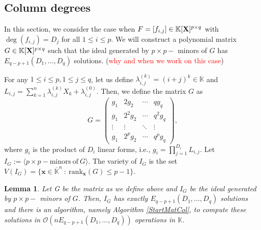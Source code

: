 \documentclass[11pt]{article}
\numberwithin{Property}{section}
\numberwithin{Theorem}{section}
\numberwithin{Proposition}{section}
\newtheorem{Lemma}{Lemma}%
\numberwithin{Lemma}{section}
\numberwithin{Corollary}{section}
\numberwithin{Definition}{section}
\numberwithin{Remark}{section}
\numberwithin{Conjecture}{section}
\numberwithin{Problem}{section}
\numberwithin{Example}{section}
\numberwithin{Claim}{section}
\renewcommand{\leq}{\leqslant}
\def\bar{\overline}
\newcommand{\bigO}[1]{\mathcal{O}(#1)} %
\newcommand{\field}{\mathbb{K}} %
\newcommand{\mat}[1]{\mathbf{\MakeUppercase{#1}}} %
\newcommand{\todo}[1]{\textcolor{red}{#1}} %
\begin{document}
\subsection{Column degrees}
\label{subsec:cd}
In this section, we consider the case when $F = [f_{i,j}] \in \field[\mat{X}]^{p\times q}$ with $\deg({f_{i,j}}) = D_j$ for all $1 \leq i \leq p$. We will construct a polynomial matrix $G \in \field[\mat{X}]^{p \times q}$ such that the ideal generated by $p \times p-$ minors of $G$ has $E_{q-p+1}(D_1, \ldots, D_q)$ solutions.
(\todo{why and when we work on this case})

For any $1 \leq i \leq p, 1 \leq j \leq q$, let us define $\lambda_{i,j}^{(k)}  = (i+j)^k \in \field$ and $L_{i,j} = \sum_{k = 1}^{n}\lambda_{i,j}^{(k)}X_k + \lambda_{i,j}^{(0)}$. Then, we define the matrix $G$ as
\[G = 
\left( \begin{matrix}
g_1 & 2g_2 & \cdots & qg_{q}\\
g_1 & 2^2g_2 & \cdots & q^2g_q\\
\vdots & \vdots & \ddots & \vdots \\
g_1 & 2^pg_2 & \cdots & q^pg_q
\end{matrix} \right),
\]
where $g_{i}$ is the product of $D_i$ linear forms, i.e., $g_i = \prod_{j = 1}^{D_i}L_{i,j}$. Let $I_G := \langle p \times p - \mathrm{minors \ of \ } G \rangle$. The variety of $I_G$ is the set $V(I_G) = \{\mathbf{x} \in \bar{\field}^n \ : \ \mathrm{rank}_{\mathbf{x}}(G) \leq p-1\}$. %
\begin{Lemma} \label{G} Let G be the matrix as we define above and $I_G$ be the ideal generated by $p \times p-$ minors of $G$. Then, $I_G$ has exactly $E_{q-p+1}(D_1, \ldots, D_q)$ solutions and there is an algorithm, namely Algorithm \ref{StartMatCol}, to compute these solutions in $\bigO{nE_{q-p+1}(D_1, \ldots, D_q)}$ operations in $\field$.
\end{Lemma}
\end{document}
